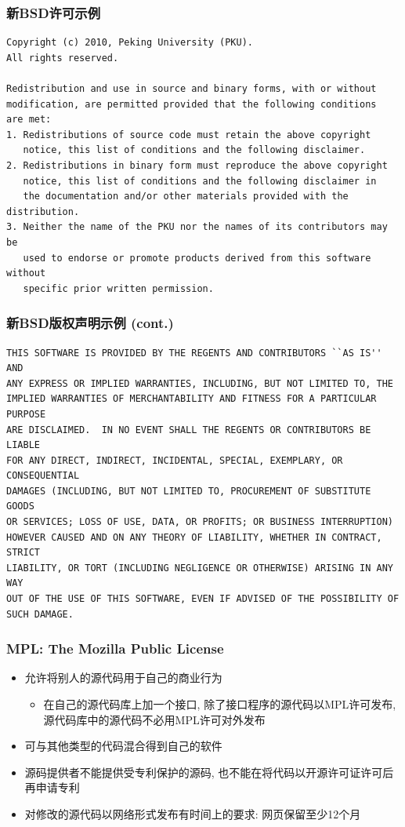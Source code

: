 \documentclass[compress]{beamer}
\begin{document}
\begin{frame}[fragile]
    \frametitle{新BSD许可示例} 
{
\scriptsize
\begin{verbatim}
Copyright (c) 2010, Peking University (PKU).
All rights reserved.

Redistribution and use in source and binary forms, with or without
modification, are permitted provided that the following conditions
are met:
1. Redistributions of source code must retain the above copyright
   notice, this list of conditions and the following disclaimer.
2. Redistributions in binary form must reproduce the above copyright
   notice, this list of conditions and the following disclaimer in
   the documentation and/or other materials provided with the distribution.
3. Neither the name of the PKU nor the names of its contributors may be 
   used to endorse or promote products derived from this software without 
   specific prior written permission.
\end{verbatim}
}
\end{frame}

\begin{frame}[fragile]
    \frametitle{新BSD版权声明示例 (cont.)} 
{
\scriptsize
\begin{verbatim}
THIS SOFTWARE IS PROVIDED BY THE REGENTS AND CONTRIBUTORS ``AS IS'' AND
ANY EXPRESS OR IMPLIED WARRANTIES, INCLUDING, BUT NOT LIMITED TO, THE
IMPLIED WARRANTIES OF MERCHANTABILITY AND FITNESS FOR A PARTICULAR PURPOSE
ARE DISCLAIMED.  IN NO EVENT SHALL THE REGENTS OR CONTRIBUTORS BE LIABLE
FOR ANY DIRECT, INDIRECT, INCIDENTAL, SPECIAL, EXEMPLARY, OR CONSEQUENTIAL
DAMAGES (INCLUDING, BUT NOT LIMITED TO, PROCUREMENT OF SUBSTITUTE GOODS
OR SERVICES; LOSS OF USE, DATA, OR PROFITS; OR BUSINESS INTERRUPTION)
HOWEVER CAUSED AND ON ANY THEORY OF LIABILITY, WHETHER IN CONTRACT, STRICT
LIABILITY, OR TORT (INCLUDING NEGLIGENCE OR OTHERWISE) ARISING IN ANY WAY
OUT OF THE USE OF THIS SOFTWARE, EVEN IF ADVISED OF THE POSSIBILITY OF
SUCH DAMAGE.
\end{verbatim}
}
\end{frame}

\begin{frame}
\frametitle{MPL: The Mozilla Public License}
\begin{itemize}
\item 允许将别人的源代码用于自己的商业行为
    \begin{itemize}
      \item 在自己的源代码库上加一个接口, 除了接口程序的源代码以MPL许可发布, 源代码库中的源代码不必用MPL许可对外发布
    \end{itemize}

\item 可与其他类型的代码混合得到自己的软件
\item 源码提供者不能提供受专利保护的源码, 也不能在将代码以开源许可证许可后再申请专利
\item 对修改的源代码以网络形式发布有时间上的要求: 网页保留至少12个月
\end{itemize}
\end{frame}
\end{document}
